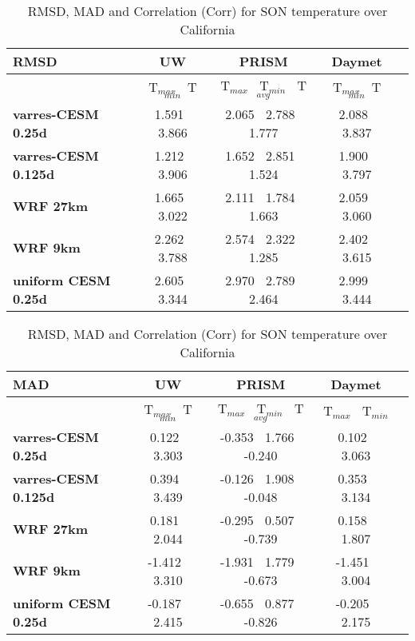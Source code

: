 \begin{table}
\begin{center}
\caption{RMSD, MAD and Correlation (Corr) for SON temperature over California} 
\begin{tabular}{lcccc}
\hline \textbf{RMSD} & \textbf{UW}  & \textbf{PRISM} & \textbf{Daymet} \\
\hline $    $ & T$_{max}$ $\     $  T$_{min}$ & T$_{max}$ $\     $  T$_{min}$ $\     $ T$_{avg}$& T$_{max}$ $\     $  T$_{min}$\\
\hline \textbf{varres-CESM 0.25d} & 1.591 $\ $ 3.866 & 2.065 $\ $ 2.788 $\ $ 1.777 & 2.088 $\ $ 3.837 \\
\textbf{varres-CESM 0.125d} & 1.212 $\ $ 3.906 & 1.652 $\ $ 2.851 $\ $ 1.524 & 1.900 $\ $ 3.797 \\
\textbf{WRF 27km} & 1.665 $\ $ 3.022 & 2.111 $\ $ 1.784 $\ $ 1.663 & 2.059 $\ $ 3.060 \\
\textbf{WRF 9km} & 2.262 $\ $ 3.788 & 2.574 $\ $ 2.322 $\ $ 1.285 & 2.402 $\ $ 3.615 \\
\textbf{uniform CESM 0.25d} & 2.605 $\ $ 3.344 & 2.970 $\ $ 2.789 $\ $ 2.464 & 2.999 $\ $ 3.444 \\
\hline
\end{tabular}

\begin{tabular}{lcccc}
\hline \textbf{MAD} & \textbf{UW}  & \textbf{PRISM} & \textbf{Daymet} \\
\hline $    $ & T$_{max}$ $\     $  T$_{min}$ & T$_{max}$ $\     $  T$_{min}$ $\     $ T$_{avg}$& T$_{max}$ $\     $  T$_{min}$\\
\hline \textbf{varres-CESM 0.25d} & 0.122 $\ $ 3.303 & -0.353 $\ $ 1.766 $\ $ -0.240 & 0.102 $\ $ 3.063 \\
\textbf{varres-CESM 0.125d} & 0.394 $\ $ 3.439 & -0.126 $\ $ 1.908 $\ $ -0.048 & 0.353 $\ $ 3.134 \\
\textbf{WRF 27km} & 0.181 $\ $ 2.044 & -0.295 $\ $ 0.507 $\ $ -0.739 & 0.158 $\ $ 1.807 \\
\textbf{WRF 9km} & -1.412 $\ $ 3.310 & -1.931 $\ $ 1.779 $\ $ -0.673 & -1.451 $\ $ 3.004 \\
\textbf{uniform CESM 0.25d} & -0.187 $\ $ 2.415 & -0.655 $\ $ 0.877 $\ $ -0.826 & -0.205 $\ $ 2.175 \\
\hline
\end{tabular}


\end{center}
\end{table}
